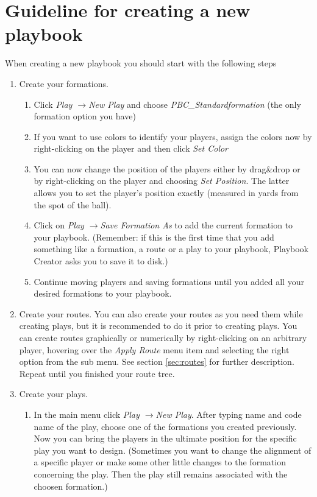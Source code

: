 \documentclass[10pt,a4paper]{article}
\newcommand{\pfeil}{$\rightarrow$}
\begin{document}
	\section{Guideline for creating a new playbook}
	\label{sec:guideline}
		When creating a new playbook you should start with the following steps
		\begin{enumerate}
			\item Create your formations.
				\begin{enumerate}
					\item Click \textit{Play \pfeil New Play} and choose \textit{PBC\_Standardformation} (the only formation option you have)
					
					\item If you want to use colors to identify your players, assign the colors now by right-clicking on the player and then click \textit{Set Color}
					
					\item You can now change the position of the players either by drag\&drop or by right-clicking on the player and choosing \textit{Set Position}. The latter allows you to set the player's position exactly (measured in yards from the spot of the ball).
					
					\item Click on \textit{Play \pfeil Save Formation As} to add the current formation to your playbook. (Remember: if this is the first time that you add something like a formation, a route or a play to your playbook, Playbook Creator asks you to save it to disk.)
					
					\item Continue moving players and saving formations until you added all your desired formations to your playbook.
				\end{enumerate}
			\item Create your routes. You can also create your routes as you need them while creating plays, but it is recommended to do it prior to creating plays. You can create routes graphically or numerically by right-clicking on an arbitrary player, hovering over the \textit{Apply Route} menu item and selecting the right option from the sub menu. See section \ref{sec:routes} for further description. Repeat until you finished your route tree.
			
			\item Create your plays.
				\begin{enumerate}
					\item In the main menu click \textit{Play \pfeil New Play}. After typing name and code name of the play, choose one of the formations you created previously. Now you can bring the players in the ultimate position for the specific play you want to design. (Sometimes you want to change the alignment of a specific player or make some other little changes to the formation concerning the play. Then the play still remains associated with the choosen formation.)
					

\end{enumerate}
\end{enumerate}
\end{document}
